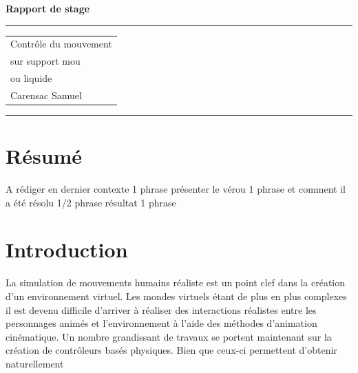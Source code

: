 \documentclass{llncs}
\begin{document}
\thispagestyle{empty}
\begin{flushleft}
\LARGE\bfseries Rapport de stage\\[2cm]
\end{flushleft}
\rule{\textwidth}{1pt}
\vspace{2pt}
\begin{flushright}
\Huge
\begin{tabular}{@{}l}
Contrôle du mouvement\\
sur support mou\\
ou liquide\\[6pt]
{\Large Carensac Samuel}
\end{tabular}
\end{flushright}
\rule{\textwidth}{1pt}
\vfill
%
\newpage
\tableofcontents
\newpage
%
\section{Résumé}
%
A rédiger en dernier
contexte 1 phrase
présenter le vérou 1 phrase
et comment il a été résolu 1/2 phrase
résultat 1 phrase
%
\section{Introduction}
%
La simulation de mouvements humains réaliste est un point clef dans la création d'un environnement virtuel. Les mondes virtuels étant de plus en plus complexes il est devenu difficile d'arriver à réaliser des interactions réalistes entre les personnages animés et l'environnement à l'aide des méthodes d'animation cinématique. Un nombre grandissant de travaux se portent maintenant sur la création de contrôleurs basés physiques. Bien que ceux-ci permettent d'obtenir naturellement
\end{document}
